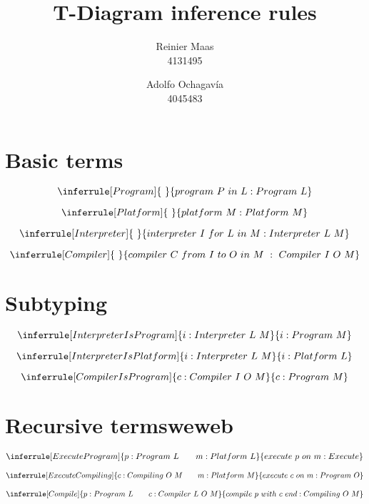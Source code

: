 \documentclass{article}
\author{
  Reinier Maas \\ 4131495
  \and
  Adolfo Ochagavía \\ 4045483
}
\title{T-Diagram inference rules}
\begin{document}
\maketitle


\section*{Basic terms}

\[
\inferrule[Program]{\ }{program\ P\ in\ L : Program\ L}
\]

\[
\inferrule[Platform]{\ }{platform\ M : Platform\ M}
\]

\[
\inferrule[Interpreter]{\ }{interpreter\ I\ for\ L\ in\ M : Interpreter\ L\ M}
\]

\[
\inferrule[Compiler]{\ }{compiler\ C\ from\ I\ to\ O\ in\ M\ :\ Compiler\ I\ O\ M}
\]

\section*{Subtyping}

\[
\inferrule[InterpreterIsProgram]{i : Interpreter\ L\ M}{i : Program\ M}
\]

\[
\inferrule[InterpreterIsPlatform]{i : Interpreter\ L\ M}{i : Platform\ L}
\]

\[
\inferrule[CompilerIsProgram]{c : Compiler\ I\ O\ M}{c : Program\ M}
\]

\section*{Recursive termsweweb}

\[
\inferrule[ExecuteProgram]{p : Program\ L \qquad m : Platform\ L}{execute\ p\ on\ m : Execute}
\]

\[
\inferrule[ExecuteCompiling]{c : Compiling\ O\ M \qquad m : Platform\ M}{execute\ c\ on\ m : Program\ O}
\]

\[
\inferrule[Compile]{p : Program\ L \qquad c : Compiler\ L\ O\ M}{compile\ p\ with\ c\ end : Compiling\ O\ M}
\]
\end{document}
